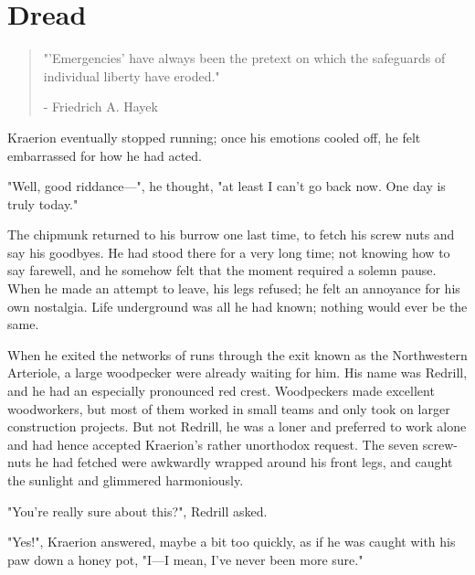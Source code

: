 \chapter{Dread}

\vspace{-1.3cm}
\begin{localsize}{10}
	\begin{quote}
		"'Emergencies' have always been the pretext on which the safeguards of individual liberty have eroded."
		\begin{flushright}- Friedrich A. Hayek\end{flushright}
	\end{quote} 
\end{localsize}
\vspace{1cm}

\renewcommand*{\thepage}{\footnotesize \hexadecimal{page}}

Kraerion eventually stopped running; once his emotions cooled off, he felt embarrassed for how he had acted. 

"Well, good riddance---", he thought, "at least I can't go back now. One day is truly today."

The chipmunk returned to his burrow one last time, to fetch his screw nuts and say his goodbyes. He had stood there for a very long time; not knowing how to say farewell, and he somehow felt that the moment required a solemn pause. When he made an attempt to leave, his legs refused; he felt an annoyance for his own nostalgia. Life underground was all he had known; nothing would ever be the same.

When he exited the networks of runs through the exit known as the Northwestern Arteriole, a large woodpecker were already waiting for him. His name was Redrill, and he had an especially pronounced red crest. Woodpeckers made excellent woodworkers, but most of them worked in small teams and only took on larger construction projects. But not Redrill, he was a loner and preferred to work alone and had hence accepted Kraerion's rather unorthodox request. The seven screw-nuts he had fetched were awkwardly wrapped around his front legs, and caught the sunlight and glimmered harmoniously. 

\renewcommand*{\thepage}{\footnotesize \arabic{page}}

"You're really sure about this?", Redrill asked.

"Yes!", Kraerion answered, maybe a bit too quickly, as if he was caught with his paw down a honey pot, "I---I mean, I've never been more sure."

